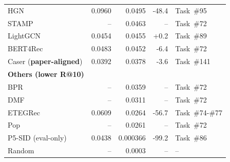 \begin{table}[t]
\begin{tabular}{l r r r l}
\quad HGN & 0.0960 & 0.0495 & -48.4 & Task~\#95 \\
\quad STAMP & -- & 0.0463 & -- & Task~\#72 \\
\quad LightGCN & 0.0454 & 0.0455 & +0.2 & Task~\#89 \\
\quad BERT4Rec & 0.0483 & 0.0452 & -6.4 & Task~\#72 \\
\quad Caser (\textbf{paper-aligned}) & 0.0392 & 0.0378 & -3.6 & Task~\#141 \\
\midrule
\textbf{Others (lower R@10)} & & & & \\
\quad BPR & -- & 0.0359 & -- & Task~\#72 \\
\quad DMF & -- & 0.0311 & -- & Task~\#72 \\
\quad ETEGRec & 0.0609 & 0.0264 & -56.7 & Task~\#74-\#77 \\
\quad Pop & -- & 0.0261 & -- & Task~\#72 \\
\quad P5-SID (eval-only) & 0.0438 & 0.000366 & -99.2 & Task~\#86 \\
\quad Random & -- & 0.0003 & -- & -- \\
\bottomrule
\end{tabular}
\end{table}